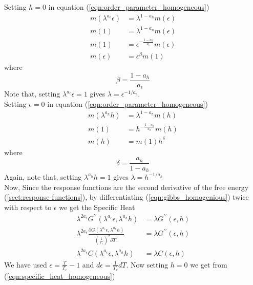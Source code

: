 	Setting $h=0$ in equation (\ref{eqn:order_parameter_homogeneous})
	\begin{align}
		m(\lambda^{a_\epsilon} \epsilon)	 &= \lambda^{1-a_h} m(\epsilon) \nonumber \\
		m(1)	 &= \lambda^{1-a_h} m(\epsilon) \nonumber \\
		m(1)	 &= \epsilon^{-\frac{1-a_h}{a_\epsilon}} m(\epsilon) \nonumber \\
		m(\epsilon) &= \epsilon^\beta m(1) \label{eqn:order_parameter_and_beta}
	\end{align}
	where
	\begin{equation}
		\beta = \frac{1-a_h}{a_\epsilon}
		\label{eqn:beta}
	\end{equation}
	Note that, setting $\lambda^{a_\epsilon} \epsilon = 1$ gives $\lambda = \epsilon^{-1/a_\epsilon}$.\\
	Setting $\epsilon=0$ in equation (\ref{eqn:order_parameter_homogeneous})
	\begin{align}
		m(\lambda^{a_h} h) &= \lambda^{1-a_h} m(h) \nonumber \\
		m(1) &= h^{-\frac{1-a_h}{a_h}} m(h) \nonumber \\
		m(h) &= m(1) h^\delta \label{eqn:order_parameter_and_delta}
	\end{align}
	where
	\begin{equation}
		\delta = \frac{a_h}{1-a_h}
		\label{eqn:delta}
	\end{equation}
	Again, note that, setting $\lambda^{a_h} h = 1$ gives $\lambda = h^{-1/a_h}$\\
	Now, Since the response functions are the second derivative of the free energy (\ref{sect:response-functions}), by differentiating (\ref{eqn:gibbs_homogenious}) twice with respect to $\epsilon$ we get the Specific Heat
	\begin{align}
		\lambda^{2 a_\epsilon} G^{\prime\prime}(\lambda^{a_\epsilon} \epsilon, \lambda^{a_h} h) &= \lambda G^{\prime \prime}(\epsilon, h) \nonumber \\
		\lambda^{2 a_\epsilon} \frac{\partial G(\lambda^{a_\epsilon} \epsilon, \lambda^{a_h} h)}{\left(\frac{1}{T_c}\right)^2 \partial T^2} &= \lambda G^{\prime \prime}(\epsilon, h) \nonumber \\
		\lambda^{2 a_\epsilon} C(\lambda^{a_\epsilon} \epsilon, \lambda^{a_h} h) &= \lambda C(\epsilon, h)
		\label{eqn:specific_heat_homogeneous}
	\end{align}
	We have used $\epsilon = \frac{T}{T_c} -1$ and $d\epsilon = \frac{1}{T_c} dT$. Now setting $h=0$ we get from (\ref{eqn:specific_heat_homogeneous})
